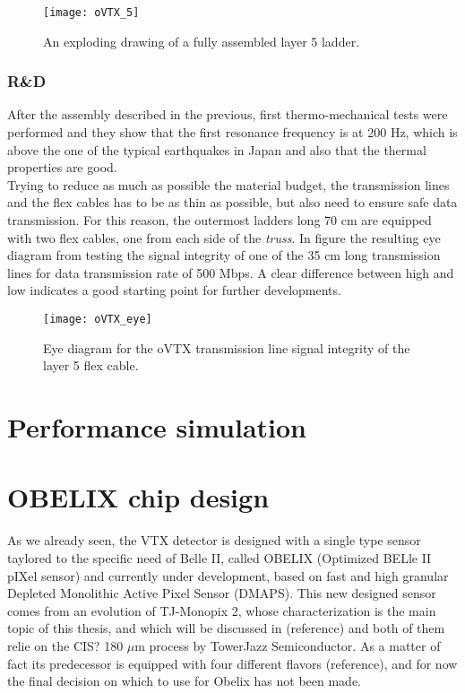 \begin{figure}[h!]
\centering
\texttt{[image: oVTX\_5]}
\caption{An exploding drawing of a fully assembled layer 5 ladder.}
\label{fig:oVTX_5}
\end{figure}

\subsubsection{R\&D}

After the assembly described in the previous, first thermo-mechanical tests were performed and they show that the first resonance frequency is at 200 Hz, which is above the one of the typical earthquakes in Japan and also that the thermal properties are good.\\

Trying to reduce as much as possible the material budget, the transmission lines and the flex cables has to be as thin as possible, but also need to ensure safe data transmission. For this reason, the outermost ladders long 70 cm are equipped with two flex cables, one from each side of the \textit{truss}. In figure  the resulting eye diagram from testing the signal integrity of one of the 35 cm long transmission lines for data transmission rate of 500 Mbps. A clear difference between high and low indicates a good starting point for further developments. 


\begin{figure}[h!]
\centering
\texttt{[image: oVTX\_eye]}
\caption{Eye diagram for the oVTX transmission line signal integrity of the layer 5 flex cable.}
\label{fig:oVTX_eye}
\end{figure}


\section{Performance simulation}


\section{OBELIX chip design}

As we already seen, the VTX detector is designed with a single type sensor taylored to the specific need of Belle II, called OBELIX (Optimized BELle II pIXel sensor) and currently under development, based on fast and high granular Depleted Monolithic Active Pixel Sensor (DMAPS). This new designed sensor comes from an evolution of TJ-Monopix 2, whose characterization is the main topic of this thesis, and which will be discussed in (reference) and both of them relie on the CIS? 180 $\mu$m process by TowerJazz Semiconductor.
As a matter of fact its predecessor is equipped with four different flavors (reference), and for now the final decision on which to use for Obelix has not been made. \\

